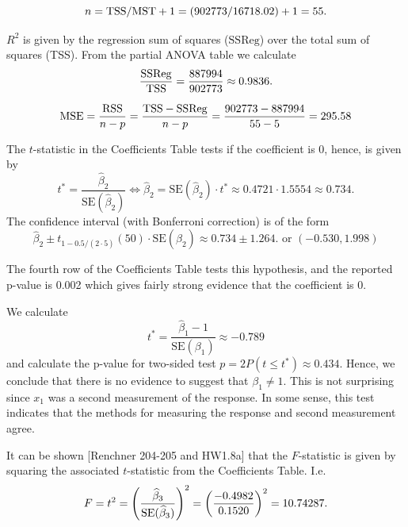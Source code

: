 \documentclass{homework}
\begin{document}
\begin{longproblem}

$$n = \mathrm{TSS}/\mathrm{MST} + 1 = (902773/16718.02) + 1 = 55.$$


$R^2$ is given by the regression sum of squares ($\mathrm{SSReg}$) over the total sum of squares (TSS).  From the partial ANOVA table we calculate
$$
  \frac{\mathrm{SSReg}}{\mathrm{TSS}} = \frac{887994}{902773} \approx 0.9836.
$$


$$
  \mathrm{MSE} = \frac{\mathrm{RSS}}{n-p} = \frac{\mathrm{TSS}-\mathrm{SSReg}}{n-p} = \frac{902773 - 887994}{55 - 5} = 295.58
$$


 The $t$-statistic in the Coefficients Table tests if the coefficient is $0$, hence, is given by
$$
   t^* = \frac{\hat \beta_2}{\mathrm{SE}(\hat \beta_2)} \iff \hat \beta_2 = \mathrm{SE}(\hat \beta_2)\cdot t^* \approx 0.4721\cdot1.5554 \approx0.734 .
$$
The confidence interval (with Bonferroni correction) is of the form 
$$\hat \beta_2 \pm t_{1-0.5/(2\cdot5)}(50)\cdot\mathrm{SE}(\hat \beta_2) \approx0.734 \pm 1.264.\text{ or }( -0.530, 1.998 )$$


The fourth row of the Coefficients Table tests this hypothesis, and the reported p-value is 0.002 which gives fairly strong evidence that the coefficient is 0.


We calculate 
$$
  t^* = \frac{\hat \beta_1 - 1}{\mathrm{SE}(\beta_1)} \approx -0.789
$$
and calculate the p-value for two-sided test $p = 2P(t \le t^*)
\approx 0.434$.  Hence, we conclude that there is no evidence to suggest that $\beta_1 \not= 1$.  This is not surprising since $x_1$ was a second measurement of the response.  In some sense, this test indicates that the methods for measuring the response and second measurement agree.


It can be shown [Renchner 204-205 and HW1.8a] that the $F$-statistic is given by squaring the associated $t$-statistic from the Coefficients Table. I.e.
$$
  F = t^2 = \left(\frac{\widehat\beta_3}{\mathrm{SE}(\widehat\beta_3)}\right)^2 = \left(\frac{-0.4982}{0.1520}\right)^2 = 10.74287.
$$


\end{longproblem}
\end{document}
